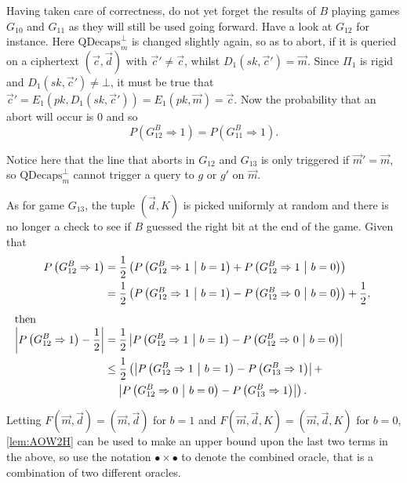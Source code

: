 Having taken care of correctness, do not yet forget the results of $B$ playing games $G_{10}$ and $G_{11}$ as they will still be used going forward. Have a look at $G_{12}$ for instance. Here $\mathrm{QDecaps}^{\bot}_{m}$ is changed slightly again, so as to abort, if it is queried on a ciphertext $\left(\vec{c}, \vec{d}\right)$ with $\vec{c}' \neq \vec{c}$, whilst $D_1\left(sk, \vec{c}'\right) = \vec{m}$. Since $\Pi_1$ is rigid and $D_1\left(sk, \vec{c}'\right) \neq \bot$, it must be true that $\vec{c}' = E_1\left(pk, D_1\left(sk, \vec{c}'\right)\right) = E_1\left(pk, \vec{m}\right) = \vec{c}$. Now the probability that an abort will occur is $0$ and so
\[
	P\left( G_{12}^B \Rightarrow 1 \right) = P\left( G_{11}^B \Rightarrow 1 \right).
\]

Notice here that the line that aborts in $G_{12}$ and $G_{13}$ is only triggered if $\vec{m}' = \vec{m}$, so $\mathrm{QDecaps}^{\bot}_{m}$ cannot trigger a query to $g$ or $g'$ on $\vec{m}$.

As for game $G_{13}$, the tuple $\left(\vec{d}, K\right)$ is picked uniformly at random and there is no longer a check to see if $B$ guessed the right bit at the end of the game. Given that
\begin{equation*}
	\begin{aligned}
		P\left( G_{12}^B \Rightarrow 1 \right) &= \frac{1}{2} \left( P\left( G_{12}^B \Rightarrow 1 \ \middle\vert \ b = 1 \right) + P\left( G_{12}^B \Rightarrow 1 \ \middle\vert \ b = 0 \right) \right)\\
			&= \frac{1}{2} \left( P\left( G_{12}^B \Rightarrow 1 \ \middle\vert \ b = 1 \right) - P\left( G_{12}^B \Rightarrow 0 \ \middle\vert \ b = 0 \right) \right) + \frac{1}{2},\\
\alignedintertext{then}
		\abs{P\left( G_{12}^B \Rightarrow 1 \right) - \frac{1}{2}} &= \frac{1}{2} \abs{P\left( G_{12}^B \Rightarrow 1 \ \middle\vert \ b = 1 \right) - P\left( G_{12}^B \Rightarrow 0 \ \middle\vert \ b = 0 \right)}\\
			& \leq \frac{1}{2} \left( \abs{P\left( G_{12}^B \Rightarrow 1 \ \middle\vert \ b = 1 \right) - P\left( G_{13}^B \Rightarrow 1 \right)} + \right.\\
			& \quad \left. \abs{P\left( G_{12}^B \Rightarrow 0 \ \middle\vert \ b = 0 \right) - P\left( G_{13}^B \Rightarrow 1 \right)} \right).
	\end{aligned}
\end{equation*}

Letting $F\left(\vec{m}, \vec{d}\right) = \left(\vec{m}, \vec{d}\right)$ for $b = 1$ and $F\left(\vec{m}, \vec{d}, K\right) = \left(\vec{m}, \vec{d}, K\right)$ for $b = 0$, \cref{lem:AOW2H} can be used to make an upper bound upon the last two terms in the above, so use the notation $\bullet \times \bullet$ to denote the combined oracle, that is a combination of two different oracles.

